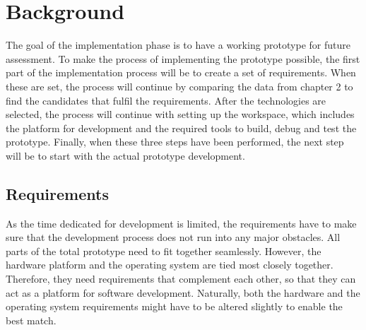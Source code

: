 \section{Background}

The goal of the implementation phase is to have a working prototype for future assessment.
To make the process of implementing the prototype possible,
	the first part of the implementation process will be to create a set of requirements.
When these are set,
	the process will continue by comparing the data from chapter 2 to find the candidates that fulfil the requirements.
After the technologies are selected,
	the process will continue with setting up the workspace,
	which includes the platform for development and the required tools to build,
	debug and test the prototype.
Finally,
	when these three steps have been performed,
	the next step will be to start with the actual prototype development.
	
\subsection*{Requirements}
As the time dedicated for development is limited,
	the requirements have to make sure that the development process does not run into any major obstacles.
All parts of the total prototype need to fit together seamlessly.
However,
	the hardware platform and the operating system are tied most closely together.
Therefore,
	they need requirements that complement each other,
	so that they can act as a platform for software development.
Naturally,
	both the hardware and the operating system requirements might have to be altered slightly to enable the best match.

